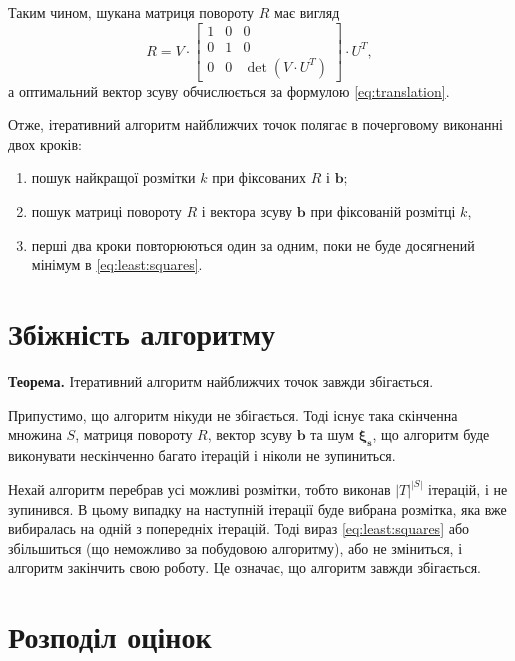 Таким чином, шукана матриця повороту $R$ має вигляд  \cite{svd}
\begin{equation}\label{eq:estimated:R}
  R =
  V \cdot
  \begin{bmatrix}
    1 & 0 & 0 \\
    0 & 1 & 0 \\
    0 & 0 & \det{ \left( V \cdot U^T \right) }
  \end{bmatrix} \cdot U^T,
\end{equation}
а оптимальний вектор зсуву обчислюється за формулою \eqref{eq:translation}.

Отже, ітеративний алгоритм найближчих точок полягає в почерговому виконанні
двох кроків:
\begin{enumerate}
  \item пошук найкращої розмітки $k$ при фіксованих $R$ і $\boldsymbol{b}$;
  \item пошук матриці повороту $R$ і вектора зсуву $ \boldsymbol{b}$
  при фіксованій розмітці $k$,
  \item перші два кроки повторюються один за одним,
  поки не буде досягнений мінімум в \eqref{eq:least:squares}.
\end{enumerate}

\section{Збіжність алгоритму}

\textbf{Теорема.}
Ітеративний алгоритм найближчих точок завжди збігається.

Припустимо, що алгоритм нікуди не збігається.
Тоді існує така скінченна множина $S$, матриця повороту $R$,
вектор зсуву $ \boldsymbol{b}$ та шум $ \boldsymbol{ \xi_s}$,
що алгоритм буде виконувати нескінченно багато ітерацій і ніколи не зупиниться.

Нехай алгоритм перебрав усі можливі розмітки,
тобто виконав $ \left| T \right|^{ \left| S \right| }$ ітерацій, і не зупинився.
В цьому випадку на наступній ітерації буде вибрана розмітка,
яка вже вибиралась на одній з попередніх ітерацій.
Тоді вираз \eqref{eq:least:squares} або збільшиться
(що неможливо за побудовою алгоритму),
або не зміниться, і алгоритм закінчить свою роботу.
Це означає, що алгоритм завжди збігається.

\section{Розподіл оцінок}

